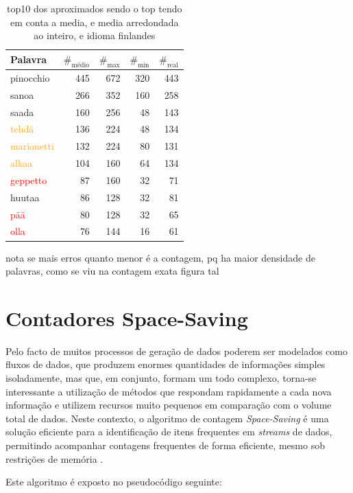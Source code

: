 \documentclass[mirror, portugues]{revdetua}
\begin{document}
\begin{table}[H]
\centering
\caption{top10 dos aproximados sendo o top tendo em conta a media, e media arredondada ao inteiro, e idioma finlandes}
\label{table:top10_aprox_finlandes}
\begin{tabular}{lrrr|r}
\toprule
Palavra & $\text{\#}_{\text{médio}}$ & $\text{\#}_{\text{max}}$ & $\text{\#}_{\text{min}}$ & $\text{\#}_{\text{real}}$ \\
\midrule
pinocchio & 445 & 672 & 320 & 443\\
sanoa & 266 & 352 & 160 & 258 \\
saada & 160 & 256 & 48 & 143 \\
\textcolor{orange}{tehdä} & 136 & 224 & 48 & 134 \\
\textcolor{orange}{marionetti} & 132 & 224 & 80 & 131 \\
\textcolor{orange}{alkaa} & 104 & 160 & 64 & 134 \\
\textcolor{red}{geppetto} & 87 & 160 & 32 & 71 \\
huutaa & 86 & 128 & 32 & 81 \\
\textcolor{red}{pää} & 80 & 128 & 32 & 65 \\
\textcolor{red}{olla} & 76 & 144 & 16 & 61 \\
\bottomrule
\end{tabular}
\end{table}

nota se mais erros quanto menor é a contagem, pq ha maior densidade de palavras, como se viu na contagem exata figura tal


\section{Contadores Space-Saving}

Pelo facto de muitos processos de geração de dados poderem ser modelados como fluxos de dados, que produzem enormes quantidades de informações simples isoladamente, mas que, em conjunto, formam um todo complexo, torna-se interessante a utilização de métodos que respondam rapidamente a cada nova informação e utilizem recursos muito pequenos em comparação com o volume total de dados. Neste contexto, o algoritmo de contagem \textit{Space-Saving} é uma solução eficiente para a identificação de itens frequentes em \textit{streams} de dados, permitindo acompanhar contagens frequentes de forma eficiente, mesmo sob restrições de memória \cite{CG09}.

Este algoritmo é exposto no pseudocódigo seguinte:
\end{document}
